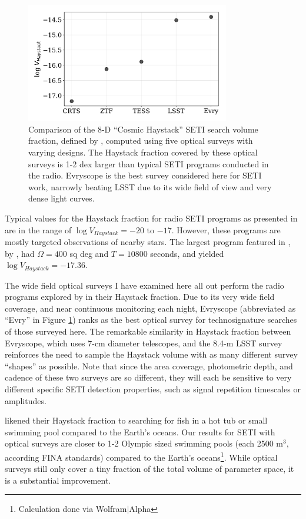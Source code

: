 \documentclass[twocolumn]{aastex62}
\begin{document}
\begin{figure}[]
\centering
\includegraphics[width=3.5in]{fig1}
\caption{
Comparison of the 8-D ``Cosmic Haystack'' SETI search volume fraction, defined by \citet{wright2018c}, computed using five optical surveys with varying designs. The Haystack fraction covered by these optical surveys is 1-2 dex larger than typical SETI programs conducted in the radio.
Evryscope \citet{law2015} is the best survey considered here for SETI work, narrowly beating LSST due to its wide field of view and very dense light curves.}
\label{fig:hay}
\end{figure}


Typical values for the Haystack fraction for radio SETI programs as presented in \citet{wright2018c}  are in the range of $\log V_{Haystack} =  -20$ to $-17$. However, these programs are mostly targeted observations of nearby stars. The largest program featured in \citet{wright2018c}, by \citet{tingay2018}, had $\Omega=400$ sq deg and $T=10800$ seconds, and yielded $\log V_{Haystack} =  -17.36$.

The wide field optical surveys I have examined here all out perform the radio programs explored by \citet{wright2018c} in their Haystack fraction. Due to its very wide field coverage, and near continuous monitoring each night, Evryscope (abbreviated as ``Evry'' in Figure \ref{fig:hay}) ranks as the best optical survey for technosignature searches of those surveyed here. The remarkable similarity in Haystack fraction between Evryscope, which uses 7-cm diameter telescopes, and the 8.4-m LSST survey reinforces the need to sample the Haystack volume with as many different survey ``shapes'' as possible. Note that since the area coverage, photometric depth, and cadence of these two surveys are so different, they will each be sensitive to very different specific SETI detection properties, such as signal repetition timescales or amplitudes.

\citet{wright2018c} likened their Haystack fraction to searching for fish in a hot tub or small swimming pool compared to the Earth's oceans. Our results for SETI with optical surveys are closer to 1-2 Olympic sized swimming pools (each 2500 m$^3$, according FINA standards) compared to the Earth's oceans\footnote{Calculation done via Wolfram$|$Alpha}. While optical surveys still only cover a tiny fraction of the total volume of parameter space, it is a substantial improvement.
\end{document}
